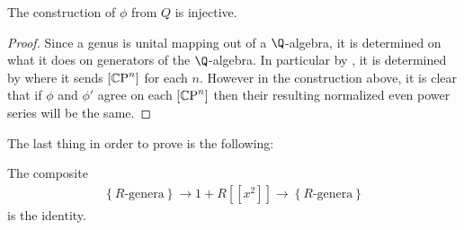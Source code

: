 \documentclass[11pt]{book}
\begin{document}
\begin{proposition} The construction of $\phi$ from $Q$ is injective.
\end{proposition}
\begin{proof} Since a genus is unital mapping out of a $\Q$-algebra, it is determined on what it does on generators of the $\Q$-algebra. In particular by , it is determined by where it sends $[{\mathbb{C}\text{P}}^n]$ for each $n$. However in the construction above, it is clear that if $\phi$ and $\phi'$ agree on each $[{\mathbb{C}\text{P}}^n]$ then their resulting normalized even power series will be the same.
\end{proof}

The last thing in order to prove  is the following:

\begin{proposition} The composite
\begin{align*}
    \left\{ R\text{-genera} \right\} \to 1 + R[[x^2]] \to \left\{ R\text{-genera} \right\}
\end{align*}
is the identity.
\end{proposition}
\end{document}
